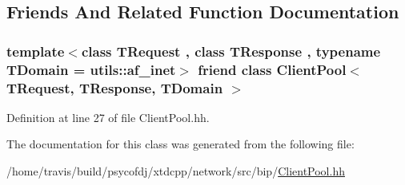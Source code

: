 \subsection{Friends And Related Function Documentation}
\hypertarget{classxtd_1_1network_1_1bip_1_1ClientPool_1_1PersistentClient_a3f5a2172b09497d719da36e7bac0eaf4}{
\subsubsection[{Client\-Pool$<$ T\-Request, T\-Response, T\-Domain $>$}]{\setlength{\rightskip}{0pt plus 5cm}template$<$class T\-Request , class T\-Response , typename T\-Domain  = utils\-::af\-\_\-inet$>$ friend class {\bf Client\-Pool}$<$ T\-Request, T\-Response, T\-Domain $>$\hspace{0.3cm}{\ttfamily [friend]}}}\label{classxtd_1_1network_1_1bip_1_1ClientPool_1_1PersistentClient_a3f5a2172b09497d719da36e7bac0eaf4}


Definition at line 27 of file Client\-Pool.\-hh.



The documentation for this class was generated from the following file\-:\begin{DoxyCompactItemize}
\item 
/home/travis/build/psycofdj/xtdcpp/network/src/bip/\hyperlink{ClientPool_8hh}{Client\-Pool.\-hh}\end{DoxyCompactItemize}
